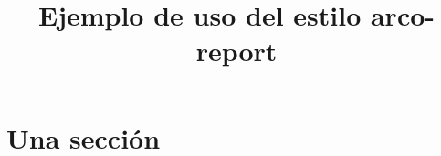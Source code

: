 \documentclass{arco-report}
\title{Ejemplo de uso del estilo arco-report}
\begin{document}
\maketitle

\section{Una sección}


\end{document}

